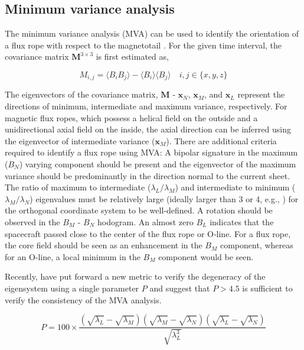 \subsection{Minimum variance analysis}
The minimum variance analysis (MVA) can be used to identify the orientation of a flux rope with respect to the magnetotail \cite{Sonnerup1967MagnetopauseObservations}. For the given time interval, the covariance matrix $\mathbf{M}^{3\times3}$ is first estimated as,

\begin{equation}
    M_{i,j} = \langle B_i B_j \rangle - \langle B_i\rangle \langle B_j\rangle \quad  i,j \in \{x, y, z\}
\end{equation}

The eigenvectors of the covariance matrix, $\mathbf{M}$ ‐ $\mathbf{x}_N$, $\mathbf{x}_M$, and $\mathbf{x}_L$ represent the directions of minimum, intermediate and maximum variance, respectively. For magnetic flux ropes, which possess a helical field on the outside and a unidirectional axial field on the inside, the axial direction can be inferred using the eigenvector of intermediate variance ($\mathbf{x}_M$). There are additional criteria required to identify a flux rope using MVA: A bipolar signature in the maximum ($B_N$) varying component should be present and the eigenvector of the maximum variance should be predominantly in the direction normal to the current sheet. The ratio of maximum to intermediate ($\lambda_L / \lambda_M$) and intermediate to minimum ($\lambda_M / \lambda_N$) eigenvalues must be relatively large (ideally larger than 3 or 4, e.g., ) for the orthogonal coordinate system to be well‐defined. A rotation should be observed in the $B_M$ - $B_N$ hodogram. An almost zero $B_L$ indicates that the spacecraft passed close to the center of the flux rope or O‐line. For a flux rope, the core field should be seen as an enhancement in the $B_M$ component, whereas for an O‐line, a local minimum in the $B_M$ component would be seen. 

Recently,  have put forward a new metric to verify the degeneracy of the eigensystem using a single parameter $P$ and suggest that $P > 4.5$ is sufficient to verify the consistency of the MVA analysis.

\begin{equation}
    P = 100 \times \frac{\left(\sqrt{\lambda_L} - \sqrt{\lambda_M} \right) \left(\sqrt{\lambda_M} - \sqrt{\lambda_N} \right) \left(\sqrt{\lambda_L} - \sqrt{\lambda_N} \right) }{\sqrt{\lambda_L^3}}
    \label{eqn:mva-p}
\end{equation}

